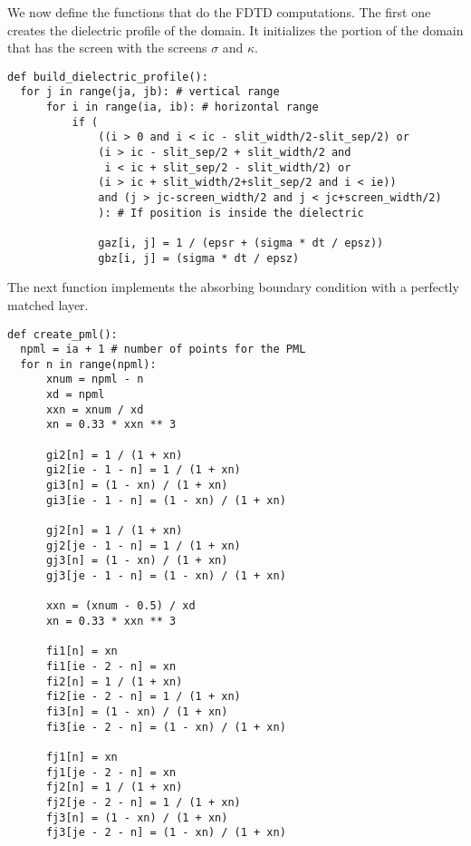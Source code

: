 \documentclass[11pt]{article}
\numberwithin{equation}{section}
\begin{document}
We now define the functions that do the FDTD computations. The first one
creates the dielectric profile of the domain. It initializes the portion of the
domain that has the screen with the screens $\sigma$ and $\kappa$.
\begin{verbatim}
def build_dielectric_profile():
  for j in range(ja, jb): # vertical range
      for i in range(ia, ib): # horizontal range
          if (
              ((i > 0 and i < ic - slit_width/2-slit_sep/2) or
              (i > ic - slit_sep/2 + slit_width/2 and 
			   i < ic + slit_sep/2 - slit_width/2) or
              (i > ic + slit_width/2+slit_sep/2 and i < ie))
              and (j > jc-screen_width/2 and j < jc+screen_width/2)
              ): # If position is inside the dielectric

              gaz[i, j] = 1 / (epsr + (sigma * dt / epsz))
              gbz[i, j] = (sigma * dt / epsz)
\end{verbatim}

The next function implements the absorbing boundary condition with a perfectly
matched layer.
\begin{verbatim}
def create_pml():
  npml = ia + 1 # number of points for the PML
  for n in range(npml):
      xnum = npml - n
      xd = npml
      xxn = xnum / xd
      xn = 0.33 * xxn ** 3

      gi2[n] = 1 / (1 + xn)
      gi2[ie - 1 - n] = 1 / (1 + xn)
      gi3[n] = (1 - xn) / (1 + xn)
      gi3[ie - 1 - n] = (1 - xn) / (1 + xn)

      gj2[n] = 1 / (1 + xn)
      gj2[je - 1 - n] = 1 / (1 + xn)
      gj3[n] = (1 - xn) / (1 + xn)
      gj3[je - 1 - n] = (1 - xn) / (1 + xn)

      xxn = (xnum - 0.5) / xd
      xn = 0.33 * xxn ** 3

      fi1[n] = xn
      fi1[ie - 2 - n] = xn
      fi2[n] = 1 / (1 + xn)
      fi2[ie - 2 - n] = 1 / (1 + xn)
      fi3[n] = (1 - xn) / (1 + xn)
      fi3[ie - 2 - n] = (1 - xn) / (1 + xn)

      fj1[n] = xn
      fj1[je - 2 - n] = xn
      fj2[n] = 1 / (1 + xn)
      fj2[je - 2 - n] = 1 / (1 + xn)
      fj3[n] = (1 - xn) / (1 + xn)
      fj3[je - 2 - n] = (1 - xn) / (1 + xn)
\end{verbatim}
\end{document}
